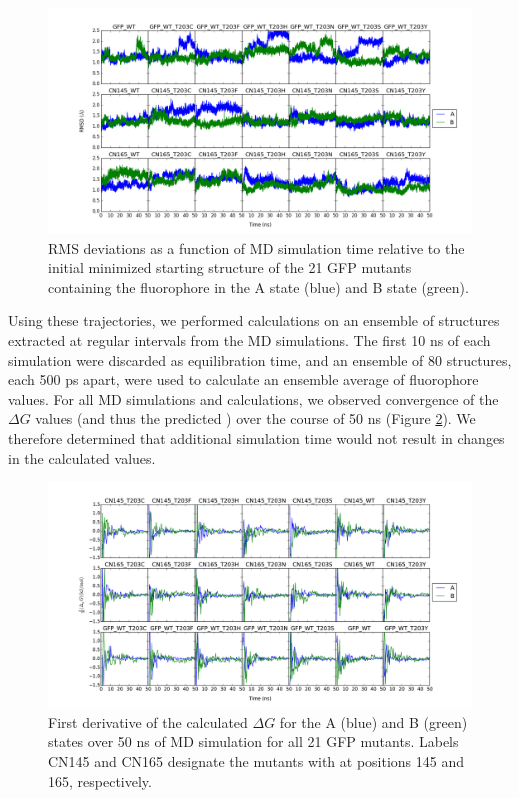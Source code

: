 \begin{figure}
    \center
    \includegraphics[width=\double]{figures-gfp-pKa/combined_rmsd.png}
    \caption[RMS deviations of each GFP construct]{
       RMS deviations as a function of MD simulation time relative to the initial minimized starting structure of the 21 GFP mutants containing the fluorophore in the A state (blue) and B state (green).
   }
    \label{fig:rmsd}
\end{figure}

Using these trajectories, we performed \pKa{} calculations on an ensemble of structures extracted at regular intervals from the MD simulations.
The first 10 \si{\ns} of each simulation were discarded as equilibration time, and an ensemble of 80 structures, each 500 ps apart, were used to calculate an ensemble average of fluorophore \pKa{} values.
For all MD simulations and \pKa{} calculations, we observed convergence of the $\Delta G$ values (and thus the predicted \pKa{}) over the course of 50 \si{\ns} (Figure \ref{fig:dG_1stD}).
We therefore determined that additional simulation time would not result in changes in the calculated \pKa{} values. 

\begin{figure}
    \center
    \includegraphics[width=\double]{figures-gfp-pKa/dG_firstDerivative.pdf}
    \caption[Convergence of $\Delta G$ calculations]{
        First derivative of the calculated $\Delta G$ for the A (blue) and B (green) states over 50 ns of MD simulation for all 21 GFP mutants. 
        Labels CN145 and CN165 designate the mutants with \pCNF{} at positions 145 and 165, respectively.
    }
    \label{fig:dG_1stD}
\end{figure}

